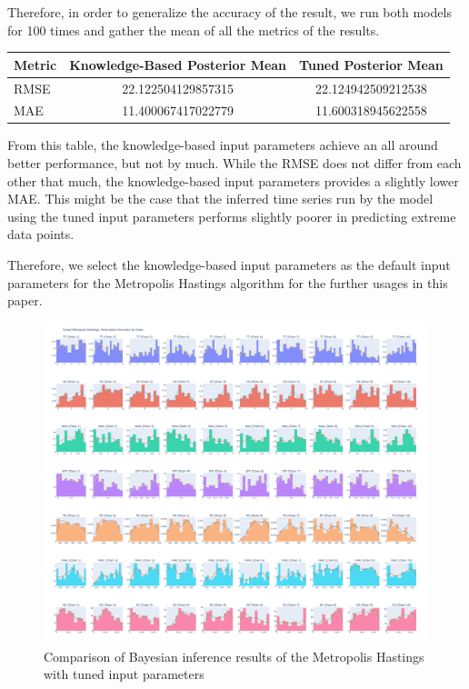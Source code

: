 Therefore, in order to generalize the accuracy of the result, we run both models for 100 times and gather the mean of all the metrics of the results.

\begin{center}
\begin{tabular}{@{}lcc@{}}
\toprule
\textbf{Metric} & \textbf{Knowledge-Based Posterior Mean} & \textbf{Tuned Posterior Mean} \\ \midrule
RMSE            & 22.122504129857315               & 22.124942509212538                  \\
MAE             & 11.400067417022779               & 11.600318945622558              \\ \bottomrule
\end{tabular}
\end{center}

From this table, the knowledge-based input parameters achieve an all around better performance, but not by much. While the RMSE does not differ from each other that much, the knowledge-based input parameters provides a slightly lower MAE. This might be the case that the inferred time series run by the model using the tuned input parameters performs slightly poorer in predicting extreme data points.

Therefore, we select the knowledge-based input parameters as the default input parameters for the Metropolis Hastings algorithm for the further usages in this paper.

\begin{figure}
    \centering
    \includegraphics[width=1.2\textwidth, angle=90]{figures/newplot.png}
    \captionsetup{width=.8\textwidth}
    \caption{Comparison of Bayesian inference results of the Metropolis Hastings with tuned input parameters}
    \label{fig:enter-label}
\end{figure}